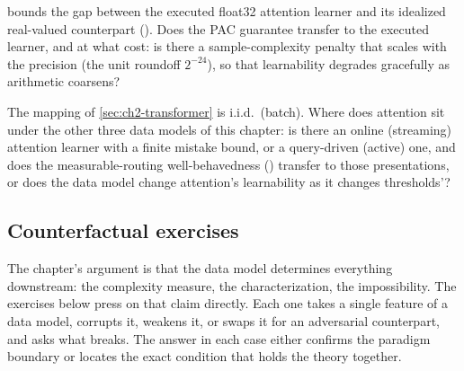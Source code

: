 \begin{openprob}
\label{op:attention-fp32-pac}
 bounds the gap between the executed float32 attention learner and its idealized real-valued counterpart ().  Does the PAC guarantee transfer to the executed learner, and at what cost: is there a sample-complexity penalty that scales with the precision (the unit roundoff $2^{-24}$), so that learnability degrades gracefully as arithmetic coarsens?
\end{openprob}

\begin{openprob}
\label{op:attention-data-models}
The mapping of \cref{sec:ch2-transformer} is i.i.d.\ (batch).  Where does attention sit under the other three data models of this chapter: is there an online (streaming) attention learner with a finite mistake bound, or a query-driven (active) one, and does the measurable-routing well-behavedness () transfer to those presentations, or does the data model change attention's learnability as it changes thresholds'?
\end{openprob}

\subsection*{Counterfactual exercises}

The chapter's argument is that the data model determines everything downstream: the complexity measure, the characterization, the impossibility. The exercises below press on that claim directly. Each one takes a single feature of a data model, corrupts it, weakens it, or swaps it for an adversarial counterpart, and asks what breaks. The answer in each case either confirms the paradigm boundary or locates the exact condition that holds the theory together.

